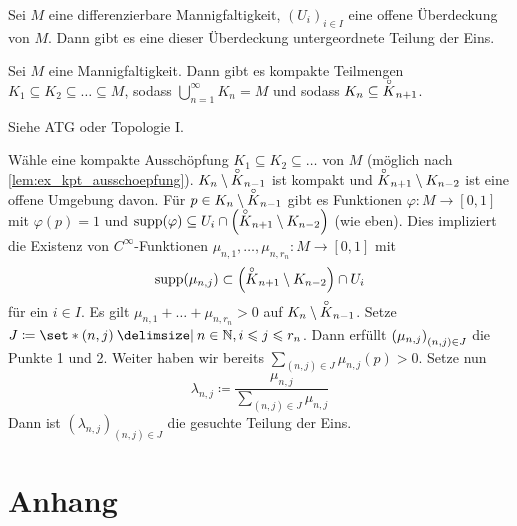 \begin{satz}[{name=[Existenz einer untergeordneten Teilung der Eins]},label=satz:ex_teilung_eins]
	Sei $M$ eine differenzierbare Mannigfaltigkeit, $(U_i)_{i \in I}$ eine offene Überdeckung von $M$.
	Dann gibt es eine dieser Überdeckung untergeordnete Teilung der Eins.
\end{satz}

\begin{lemma}[{name=[Existenz kompakter Ausschöpfungen]},label=lem:ex_kpt_ausschoepfung]
	Sei $M$ eine Mannigfaltigkeit.
	Dann gibt es kompakte Teilmengen $K_1 \subseteq K_2 \subseteq \ldots \subseteq M$, sodass $\bigcup_{n=1}^\infty K_n = M$ und sodass $K_n \subseteq \interior{K}_{n+1}$.
\end{lemma}
\begin{beweis}
	Siehe ATG oder Topologie I.
\end{beweis}
\begin{beweis}[{name={von \ref{satz:ex_teilung_eins}}}]
	Wähle eine kompakte Ausschöpfung $K_1 \subseteq K_2 \subseteq \ldots $ von $M$ (möglich nach \cref{lem:ex_kpt_ausschoepfung}).
	$K_n \setminus \interior{K}_{n-1}$ ist kompakt und $\interior{K}_{n+1} \setminus K_{n-2}$ ist eine offene Umgebung davon.
	Für $p \in K_n \setminus \interior{K}_{n-1}$ gibt es Funktionen $\varphi \colon M \to [0,1]$ mit $\varphi(p)=1$ und $\supp(\varphi) \subseteq U_i \cap \enbrace*{\interior{K}_{n+1} \setminus K_{n-2}}$ (wie eben).
	Dies impliziert die Existenz von $C^\infty$-Funktionen $\mu_{n,1}, \ldots , \mu_{n,r_n} \colon M \to [0,1]$ mit
	\[
		\supp(\mu_{n,j}) \subset \enbrace*{\interior{K}_{n+1} \setminus K_{n-2}} \cap U_i
	\]
	für ein $i \in I$.
	Es gilt $\mu_{n,1}+ \ldots +  \mu_{n,r_n} > 0$ auf $K_n \setminus \interior{K}_{n-1}$.
	Setze $J \coloneqq \set*{(n,j) \given n \in \mathbb{N}, i \le j \le r_n}$.
	Dann erfüllt $\enbrace*{\mu_{n,j}}_{(n,j) \in J}$ die Punkte 1 und 2.
	Weiter haben wir bereits $\sum_{(n,j) \in J} \mu_{n,j}(p) >0$.
	Setze nun
	\[
		\lambda_{n,j} \coloneqq \frac{\mu_{n,j}}{\sum_{(n,j) \in J} \mu_{n,j}} 
	\]
	Dann ist $(\lambda_{n,j})_{(n,j) \in J}$ die gesuchte Teilung der Eins.
\end{beweis}



\cleardoubleoddemptypage
{}
\setcounter{page}{1}
\cleardoubleoddemptypage
\appendix

\chapter{Anhang} %
\label{sec:anhang}

\printindex
\printbibliography
\listoffigures
{}
\todototoc

